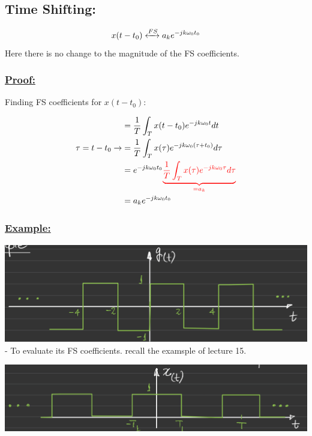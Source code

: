 \documentclass{article}
\begin{document}
\subsection[]{Time Shifting:}

\begin{equation}
    x(t-t_0) \xleftrightarrow[]{FS}{a_k e^{-jk \omega_0 t_0}}
\end{equation}
Here there is no change to the magnitude of the FS coefficients.

\subsubsection{\underline{Proof:}}
Finding FS coefficients for $x(t-t_0)$:

\begin{align}
     & = \frac{1}{T} \int^{}_{T} x(t-t_0) e^{-jk \omega_0 t} dt                                               \\ \tau = t-t_0 \rightarrow
     & = \frac{1}{T} \int^{}_{T} x(\tau) e^{-jk \omega_0 (\tau + t_0)} d\tau                                  \\
     & = e^{-jk \omega_0 t_0} {\color{red}\underbrace{\frac{1}{T} \int^{}_{T} x(\tau) e^{-jk \omega_0 \tau} d\tau}_{ = a_k}} \\
     & = a_k e^{-jk \omega_0 t_0}
\end{align}

\subsubsection[]{\underline{Example:}}
\includegraphics[width=\textwidth]{1.2.2example}
- To evaluate its FS coefficients. recall the examsple of lecture 15.

\includegraphics[width=\textwidth]{1.2.2example2}
\end{document}
